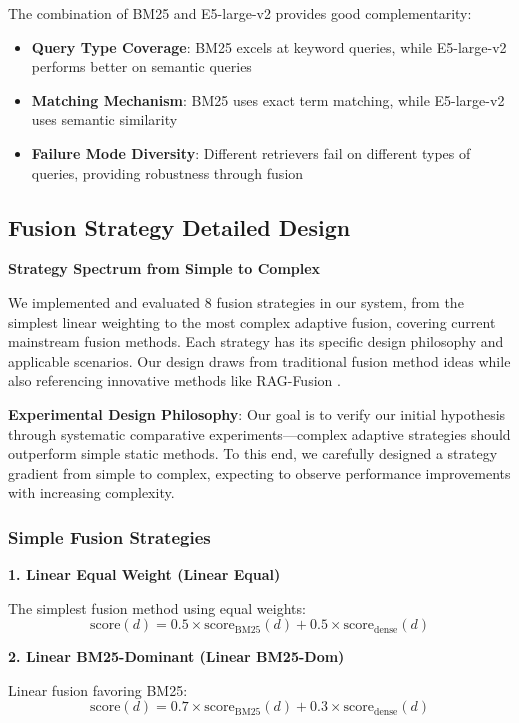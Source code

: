 \documentclass[letterpaper]{article} %
\begin{document}
The combination of BM25 and E5-large-v2 provides good complementarity:

\begin{itemize}
\item \textbf{Query Type Coverage}: BM25 excels at keyword queries, while E5-large-v2 performs better on semantic queries
\item \textbf{Matching Mechanism}: BM25 uses exact term matching, while E5-large-v2 uses semantic similarity
\item \textbf{Failure Mode Diversity}: Different retrievers fail on different types of queries, providing robustness through fusion
\end{itemize}

\subsection{Fusion Strategy Detailed Design}

\textbf{Strategy Spectrum from Simple to Complex}

We implemented and evaluated 8 fusion strategies in our system, from the simplest linear weighting to the most complex adaptive fusion, covering current mainstream fusion methods. Each strategy has its specific design philosophy and applicable scenarios. Our design draws from traditional fusion method ideas while also referencing innovative methods like RAG-Fusion \cite{rackauckas2024rag}.

\textbf{Experimental Design Philosophy}: Our goal is to verify our initial hypothesis through systematic comparative experiments—complex adaptive strategies should outperform simple static methods. To this end, we carefully designed a strategy gradient from simple to complex, expecting to observe performance improvements with increasing complexity.

\subsubsection{Simple Fusion Strategies}

\textbf{1. Linear Equal Weight (Linear Equal)}

The simplest fusion method using equal weights:
$$\text{score}(d) = 0.5 \times \text{score}_{\text{BM25}}(d) + 0.5 \times \text{score}_{\text{dense}}(d)$$

\textbf{2. Linear BM25-Dominant (Linear BM25-Dom)}

Linear fusion favoring BM25:
$$\text{score}(d) = 0.7 \times \text{score}_{\text{BM25}}(d) + 0.3 \times \text{score}_{\text{dense}}(d)$$
\end{document}
